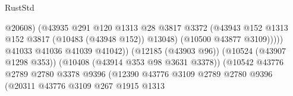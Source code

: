 \begin{lexlean}{RustStd}
\begin{coremodule}
                                                            @20608)
                                                          (@43935
                                                            @291
                                                            @120
                                                            @1313
                                                            @28
                                                            @3817
                                                            @3372
                                                            (@43943
                                                              @152
                                                              @1313
                                                              @152
                                                              @3817
                                                              (@10483 (@43948 @152))
                                                              @13048)
                                                            (@10500 @43877 @3109)))))
                                                    @41033
                                                    @41036
                                                    @41039
                                                    @41042))
                                                (@12185 (@43903 @96))
                                                (@10524 (@43907 @1298 @353))
                                                (@10408 (@43914 @353 @98 @3631 @3378))
                                                (@10542
                                                  @43776
                                                  @2789
                                                  @2780
                                                  @3378
                                                  @9396
                                                  (@12390
                                                    @43776
                                                    @3109
                                                    @2789
                                                    @2780
                                                    @9396
                                                    (@20311
                                                      @43776
                                                      @3109
                                                      @267
                                                      @1915
                                                      @1313

\end{coremodule}
\end{lexlean}
